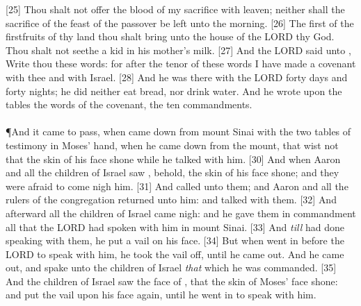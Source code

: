 [25] \textcolor[cmyk]{0.99998,1,0,0}{Thou shalt not offer the blood of my sacrifice with leaven; neither shall the sacrifice of the feast of the passover be left unto the morning.}
[26] \textcolor[cmyk]{0.99998,1,0,0}{The first of the firstfruits of thy land thou shalt bring unto the house of the LORD thy God. Thou shalt not seethe a kid in his mother's milk.}
[27] \textcolor[cmyk]{0.99998,1,0,0}{And the LORD said unto , Write thou these words: for after the tenor of these words I have made a covenant with thee and with Israel.}
[28] \textcolor[cmyk]{0.99998,1,0,0}{And he was there with the LORD forty days and forty nights; he did neither eat bread, nor drink water. And he wrote upon the tables the words of the covenant, the ten commandments.}\\
\\
\P \textcolor[cmyk]{0.99998,1,0,0}{And it came to pass, when  came down from mount Sinai with the two tables of testimony in Moses' hand, when he came down from the mount, that  wist not that the skin of his face shone while he talked with him.}
[30] \textcolor[cmyk]{0.99998,1,0,0}{And when Aaron and all the children of Israel saw , behold, the skin of his face shone; and they were afraid to come nigh him.}
[31] \textcolor[cmyk]{0.99998,1,0,0}{And  called unto them; and Aaron and all the rulers of the congregation returned unto him: and  talked with them.}
[32] \textcolor[cmyk]{0.99998,1,0,0}{And afterward all the children of Israel came nigh: and he gave them in commandment all that the LORD had spoken with him in mount Sinai.}
[33] \textcolor[cmyk]{0.99998,1,0,0}{And \emph{till}  had done speaking with them, he put a vail on his face.}
[34] \textcolor[cmyk]{0.99998,1,0,0}{But when  went in before the LORD to speak with him, he took the vail off, until he came out. And he came out, and spake unto the children of Israel \emph{that} which he was commanded.}
[35] \textcolor[cmyk]{0.99998,1,0,0}{And the children of Israel saw the face of , that the skin of Moses' face shone: and  put the vail upon his face again, until he went in to speak with him.}
